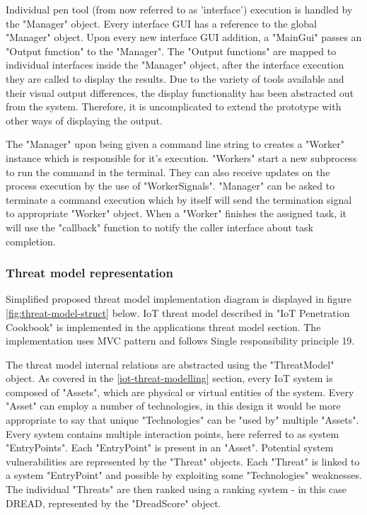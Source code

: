 Individual pen tool (from now referred to as 'interface') execution is handled by the "Manager" object. Every interface GUI has a reference to the global "Manager" object. Upon every new interface GUI addition, a "MainGui" passes an "Output function" to the "Manager". The "Output functions" are mapped to individual interfaces inside the "Manager" object, after the interface execution they are called to display the results. Due to the variety of tools available and their visual output differences, the display functionality has been abstracted out from the system. Therefore, it is uncomplicated to extend the prototype with other ways of displaying the output. 

The "Manager" upon being given a command line string to creates a "Worker" instance which is responsible for it's execution. "Workers" start a new subprocess to run the command in the terminal. They can also receive updates on the process execution by the use of "WorkerSignals". "Manager" can be asked to terminate a command execution which by itself will send the termination signal to appropriate "Worker" object. When a "Worker" finishes the assigned task, it will use the "callback" function to notify the caller interface about task completion.

\subsubsection{Threat model representation}
Simplified proposed threat model implementation diagram is displayed in figure \ref{fig:threat-model-struct} below.\newline
IoT threat model described in "IoT Penetration Cookbook"\cite{cookbook} is implemented in the applications threat model section. The implementation uses MVC pattern and follows Single responsibility principle {19}. 

The threat model internal relations are abstracted using the "ThreatModel" object. As covered in the \ref{iot-threat-modelling} section, every IoT system is composed of "Assets", which are physical or virtual entities of the system. Every "Asset" can employ a number of technologies, in this design it would be more appropriate to say  that unique "Technologies" can be "used by" multiple "Assets". Every system contains multiple interaction points, here referred to as system "EntryPoints". Each "EntryPoint" is present in an "Asset". Potential system vulnerabilities are represented by the "Threat" objects. Each "Threat" is linked to a system "EntryPoint" and possible by exploiting some "Technologies" weaknesses. The individual "Threats" are then ranked using a ranking system - in this case DREAD, represented by the "DreadScore" object.

